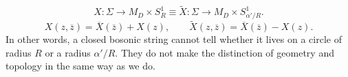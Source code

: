 \begin{equation}
  X \colon \Sigma \to M_D \times S^1_R \equiv \widetilde{X} \colon \Sigma \to M_D \times S^1_{\alpha'/R}.
\end{equation}
\begin{equation}
  X(z, \overline{z}{}) = \overline{X}{}(\overline{z}{}) + X(z), \qquad \widetilde{X}(z, \overline{z}{}) = \overline{X}{}(\overline{z}{}) - X(z).
\end{equation}
In other words, a closed bosonic string cannot tell whether it lives on a circle of radius $R$ or a radius $\alpha' / R$. They do not make the distinction of geometry and topology in the same way as we do.
